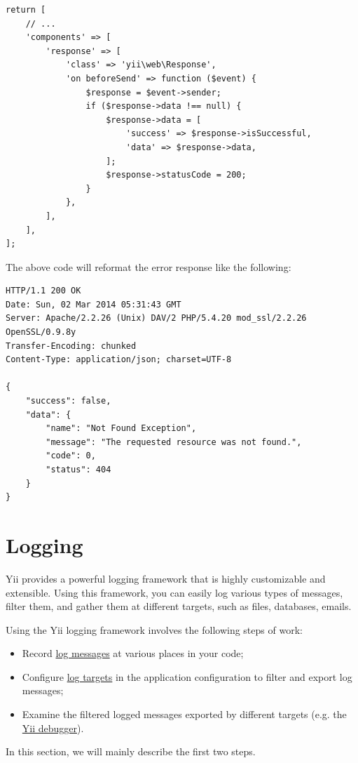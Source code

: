\lstset{language=php}\begin{lstlisting}
return [
    // ...
    'components' => [
        'response' => [
            'class' => 'yii\web\Response',
            'on beforeSend' => function ($event) {
                $response = $event->sender;
                if ($response->data !== null) {
                    $response->data = [
                        'success' => $response->isSuccessful,
                        'data' => $response->data,
                    ];
                    $response->statusCode = 200;
                }
            },
        ],
    ],
];
\end{lstlisting}
The above code will reformat the error response like the following:

\begin{lstlisting}
HTTP/1.1 200 OK
Date: Sun, 02 Mar 2014 05:31:43 GMT
Server: Apache/2.2.26 (Unix) DAV/2 PHP/5.4.20 mod_ssl/2.2.26 OpenSSL/0.9.8y
Transfer-Encoding: chunked
Content-Type: application/json; charset=UTF-8

{
    "success": false,
    "data": {
        "name": "Not Found Exception",
        "message": "The requested resource was not found.",
        "code": 0,
        "status": 404
    }
}
\end{lstlisting}


\label{runtime-logging.md}\section{Logging}
Yii provides a powerful logging framework that is highly customizable and extensible. Using this framework, you
can easily log various types of messages, filter them, and gather them at different targets, such as files, databases,
emails. 

Using the Yii logging framework involves the following steps of work:

\begin{itemize}
\item Record \hyperref[runtime-logging.md::::log-messages]{log messages} at various places in your code;
\item Configure \hyperref[runtime-logging.md::::log-targets]{log targets} in the application configuration to filter and export log messages;
\item Examine the filtered logged messages exported by different targets (e.g. the \hyperref[tool-debugger.md]{Yii debugger}).
\end{itemize}
In this section, we will mainly describe the first two steps.


